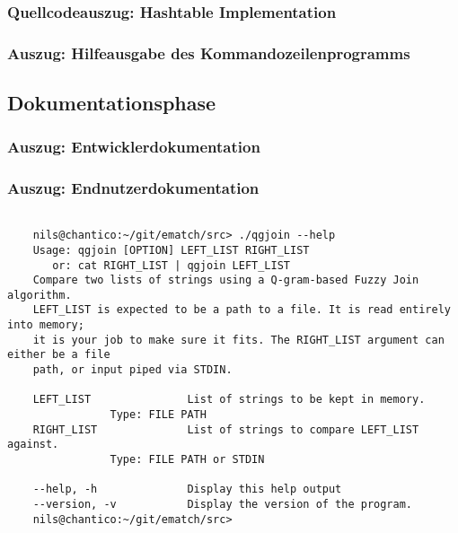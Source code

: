 \subsubsection{Quellcodeauszug: Hashtable Implementation}


\subsubsection{Auszug: Hilfeausgabe des Kommandozeilenprogramms}

\subsection{Dokumentationsphase}
\subsubsection{Auszug: Entwicklerdokumentation}


\subsubsection{Auszug: Endnutzerdokumentation}

\begin{lstlisting}[style=xterm, label=fig:cliHelp, caption=Ausgabe der Endnutzerdokumentation über den --help parameter]

	nils@chantico:~/git/ematch/src> ./qgjoin --help
	Usage: qgjoin [OPTION] LEFT_LIST RIGHT_LIST
	   or: cat RIGHT_LIST | qgjoin LEFT_LIST
	Compare two lists of strings using a Q-gram-based Fuzzy Join algorithm.
	LEFT_LIST is expected to be a path to a file. It is read entirely into memory;
	it is your job to make sure it fits. The RIGHT_LIST argument can either be a file
	path, or input piped via STDIN.
	
	LEFT_LIST               List of strings to be kept in memory.
				Type: FILE PATH
	RIGHT_LIST              List of strings to compare LEFT_LIST against.
				Type: FILE PATH or STDIN
	
	--help, -h              Display this help output
	--version, -v           Display the version of the program.
	nils@chantico:~/git/ematch/src>

\end{lstlisting}


